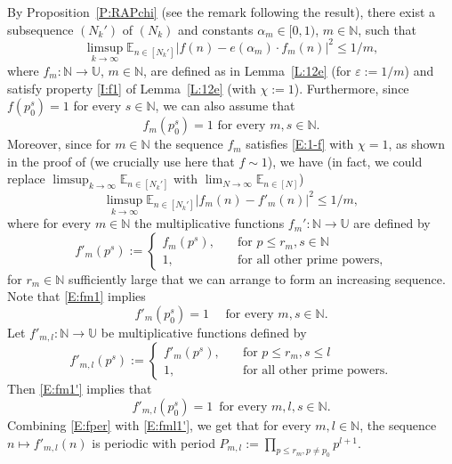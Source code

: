\documentclass[11pt]{amsart}
\theoremstyle{definition}
\newcommand{\E}{{\mathbb E}}
\newcommand{\N}{{\mathbb N}}
\newcommand{\U}{{\mathbb U}}
\begin{document}
By Proposition~\ref{P:RAPchi} (see the remark following the result), there exist a subsequence $(N_k')$ of $(N_k)$ and constants $\alpha_m\in [0,1)$, $m\in \N$, such that
\begin{equation}\label{E:fkn}
		\limsup_{k\to\infty}\E_{n\in[N_k']}|f(n)-e(\alpha_m)\cdot f_m(n)|^2\leq 1/m,
\end{equation}
where
$f_m\colon \N\to \U$, $m\in \N$, are  defined as
in Lemma~\ref{L:12e} (for $\varepsilon:=1/m$) and satisfy property \eqref{I:f1} of Lemma~\ref{L:12e} (with $\chi:=1$). Furthermore, since $f(p_0^s)=1$ for every $s\in \N$, we
can also assume that
\begin{equation}\label{E:fm1}
f_m(p_0^s)=1 \text{ for every } m,s\in \N.
\end{equation}
  Moreover, since for $m\in\N$ the sequence $f_m$ satisfies  \eqref{E:1-f} with $\chi=1$,
as shown in the proof of \cite[Lemma~4]{DD82} (we crucially use here that $f\sim 1$), we have
(in fact, we could replace $\limsup_{k\to\infty}\E_{n\in[N_k']}$ with
	$\lim_{N\to \infty} \E_{n\in [N]}$)
\begin{equation}\label{E:fkn'}
	\limsup_{k\to\infty}\E_{n\in[N_k']}|f_m(n)-f'_m(n)|^2\leq 1/m,
\end{equation}
where for every $m\in \N$ the multiplicative functions $f_m'\colon \N\to \U$ are  defined by
$$
f'_m(p^s):=\begin{cases}
	f_m(p^s), \quad &\text{for } p\leq r_m, s\in \N\\
	1, \quad &\text{for all other prime powers},
\end{cases}
$$
for $r_m\in \N$ sufficiently large that we can arrange to form an increasing sequence.
Note that  \eqref{E:fm1} implies
\begin{equation}\label{E:fm1'}
	f'_m(p_0^s)=1 \quad  \text{ for every } m,s\in \N.
\end{equation}
Let $f'_{m,l}\colon \N\to \U$ be multiplicative functions  defined by  %
$$
f'_{m,l}(p^s):=\begin{cases}
	f'_m(p^s), \quad &\text{for } p\leq r_m, s\leq l\\
	1, \quad &\text{for all other prime powers}.
\end{cases}
$$
Then \eqref{E:fm1'} implies that
\begin{equation}\label{E:fml1'}
f'_{m,l}(p_0^s)=1 \, \text{ for every } m,l,s\in \N.
\end{equation}
Combining  \eqref{E:fper} with \eqref{E:fml1'}, we get that  for every $m,l\in \N$,  the sequence $n\mapsto f'_{m,l}(n)$ is  periodic   with period $P_{m,l}:=\prod_{p\leq r_m, p\neq p_0}p^{l+1}$.
\end{document}
